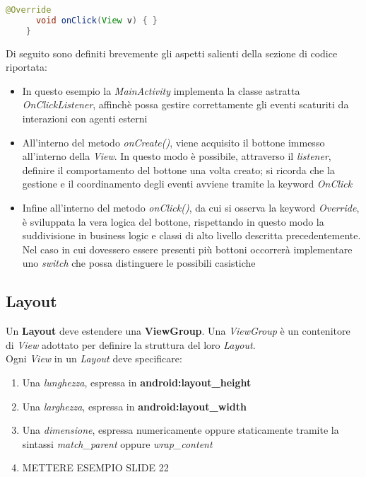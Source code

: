 \documentclass{article}
\begin{document}
\begin{enumerate}
\begin{lstlisting}[language=JAVA, title=Gestione evento tramite Event Listener]
      @Override 
      void onClick(View v) { }
    }
  \end{lstlisting}
  Di seguito sono definiti brevemente gli aspetti salienti della sezione di codice riportata:
  \begin{itemize}
    \itemsep0em
    \item In questo esempio la \textit{MainActivity} implementa la classe astratta \textit{OnClickListener}, affinchè possa gestire correttamente gli eventi scaturiti da interazioni con agenti esterni
    \item All'interno del metodo \textit{onCreate()}, viene acquisito il bottone immesso all'interno della \textit{View}. In questo modo è possibile, attraverso il \textit{listener}, definire il comportamento del bottone una volta creato; si ricorda che la gestione e il coordinamento degli eventi avviene tramite la keyword \textit{OnClick}
    \item Infine all'interno del metodo \textit{onClick()}, da cui si osserva la keyword \textit{Override}, è sviluppata la vera logica del bottone, rispettando in questo modo la suddivisione in business logic e classi di alto livello descritta precedentemente. Nel caso in cui dovessero essere presenti più bottoni occorrerà implementare uno \textit{switch} che possa distinguere le possibili casistiche
  \end{itemize}
\end{enumerate}

\subsection*{Layout}
Un \textbf{Layout} deve estendere una \textbf{ViewGroup}. Una \textit{ViewGroup} è un contenitore di \textit{View} adottato per definire la struttura del loro \textit{Layout}. \vspace*{14pt}\\
Ogni \textit{View} in un \textit{Layout} deve specificare:
\begin{enumerate}
  \itemsep0em
  \renewcommand{\labelenumi}{-}
  \item Una \textit{lunghezza}, espressa in \textbf{android:layout\_height}
  \item Una \textit{larghezza}, espressa in \textbf{android:layout\_width} 
  \item Una \textit{dimensione}, espressa numericamente oppure staticamente tramite la sintassi \textit{match\_parent} oppure \textit{wrap\_content}
  \item METTERE ESEMPIO SLIDE 22
\end{enumerate}
\end{document}
